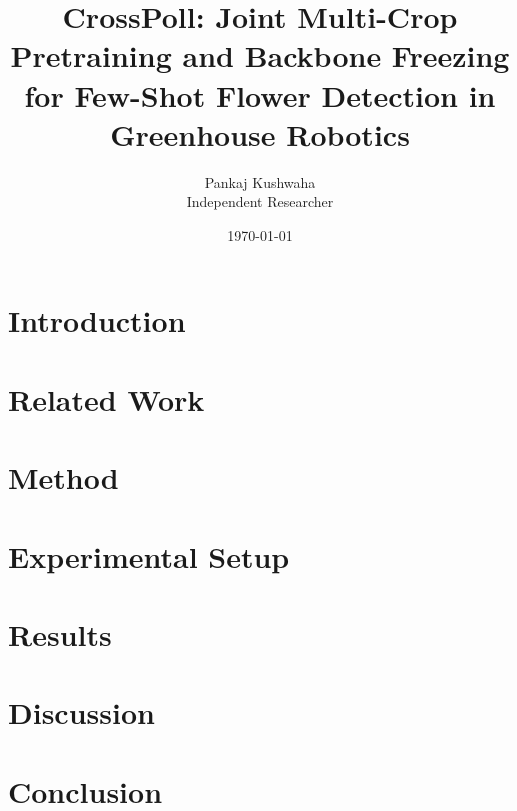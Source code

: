 \documentclass[11pt]{article}
\title{CrossPoll: Joint Multi-Crop Pretraining and Backbone Freezing for Few-Shot Flower Detection in Greenhouse Robotics}
\author{Pankaj Kushwaha \\ Independent Researcher}
\date{\today}
\begin{document}
\maketitle



\section{Introduction}
\label{sec:introduction}


\section{Related Work}
\label{sec:related}


\section{Method}
\label{sec:method}


\section{Experimental Setup}
\label{sec:experiments}


\section{Results}
\label{sec:results}


\section{Discussion}
\label{sec:discussion}


\section{Conclusion}
\label{sec:conclusion}




\end{document}
